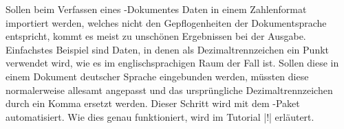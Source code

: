Sollen beim Verfassen eines -Dokumentes Daten in einem 
Zahlenformat importiert werden, welches nicht den Gepflogenheiten der 
Dokumentsprache entspricht, kommt es meist zu unschönen Ergebnissen bei der 
Ausgabe. Einfachstes Beispiel sind Daten, in denen als Dezimaltrennzeichen ein 
Punkt verwendet wird, wie es im englischsprachigen Raum der Fall ist. Sollen 
diese in einem Dokument deutscher Sprache eingebunden werden, müssten diese 
normalerweise allesamt angepasst und das ursprüngliche Dezimaltrennzeichen 
durch ein Komma ersetzt werden. Dieser Schritt wird mit dem \TUDScript-Paket 
 automatisiert. Wie dies genau funktioniert, wird im Tutorial 
|!| erläutert.%
%
